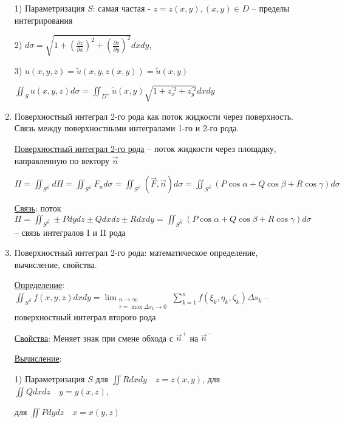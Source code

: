 \documentclass[12pt]{article}
\begin{document}
\begin{enumerate}
        1) Параметризация $S$: самая частая - $z = z(x, y), (x, y) \in D$ -- пределы интегрирования

        2) $d\sigma = \sqrt{1 + \left(\frac{\partial z}{\partial x}\right)^2 + \left(\frac{\partial z}{\partial y}\right)^2} dxdy$,

        3) $u(x, y, z) = \tilde{u}(x, y, z(x, y)) = \tilde{u}(x, y)$

        $\iint_S u(x, y, z) d\sigma = \iint_{D^+} \tilde{u}(x, y) \sqrt{1 + z_x^{\prime 2} + z_y^{\prime 2}} dxdy$


        \item Поверхностный интеграл 2-го рода как поток жидкости через поверхность. Связь между поверхностными интегралами 1-го и 2-го рода.

        \hyperlink{surfaceintegralofsecondkind}{Поверхностный интеграл 2-го рода} -- поток жидкости через площадку, направленную по вектору $\overrightarrow{n}$

        $\Pi = \iint_{S^{\overrightarrow{n}}} d\Pi = \iint_{S^{\overrightarrow{n}}} F_n d\sigma = \iint_{S^{\overrightarrow{n}}} (\overrightarrow{F}, \overrightarrow{n})d\sigma = \iint_{S^{\overrightarrow{n}}} (P\cos\alpha + Q\cos\beta + R\cos\gamma)d\sigma$

        \hyperlink{connectionbetweensurfaceintegral}{Связь}: поток $\Pi = \iint_{S^{\overrightarrow{n}}} \pm Pdydz \pm Qdxdz \pm Rdxdy = \iint_{S^{\overrightarrow{n}}} (P\cos\alpha + Q\cos\beta + R\cos\gamma) d\sigma$ -- связь интегралов I и II рода

        \item Поверхностный интеграл 2-го рода: математическое определение, вычисление, свойства.

        \hyperlink{surfaceintegralofsecondkindmath}{Определение}: $\iint_{S^{\overrightarrow{n}}} f(x, y, z) dxdy = \lim_{\substack{n \to \infty \\ \tau = \max \Delta s_k \to 0}} \sum_{k=1}^n f(\xi_k, \eta_k, \zeta_k) \Delta s_k$ -- поверхностный интеграл второго рода

        \hyperlink{surfaceintegralofsecondkindproperties}{Свойства}: Меняет знак при смене обхода с $\overrightarrow{n}^+$ на $\overrightarrow{n}^-$

        \hyperlink{surfaceintegralofsecondkindcalculation}{Вычисление}:

        1) Параметризация $S$ \quad для $\iint Rdxdy \quad z = z(x, y)$, для $\iint Qdxdz \quad y = y(x, z)$,

        для $\iint Pdydz \quad x = x(y, z)$


\end{enumerate}
\end{document}
